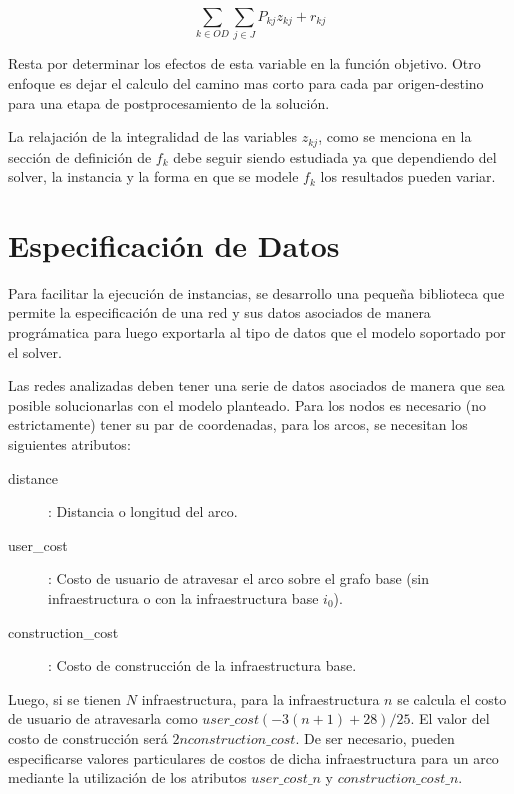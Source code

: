 \documentclass{article}
\begin{document}
  \begin{equation}
    \sum_{k \in OD} \sum_{j \in J} P_{kj}z_{kj} + r_{kj}
  \end{equation}

  Resta por determinar los efectos de esta variable en la función objetivo. Otro enfoque es dejar el calculo del camino mas corto para cada par origen-destino para una etapa de postprocesamiento de la solución.

  La relajación de la integralidad de las variables $z_{kj}$, como se menciona en la sección de definición de $f_k$ debe seguir siendo estudiada ya que dependiendo del solver, la instancia y la forma en que se modele $f_k$ los resultados pueden variar.

  \section*{Especificación de Datos}

  Para facilitar la ejecución de instancias, se desarrollo una pequeña biblioteca que permite la especificación de una red y sus datos asociados de manera prográmatica para luego exportarla al tipo de datos que el modelo soportado por el solver.

  Las redes analizadas deben tener una serie de datos asociados de manera que sea posible solucionarlas con el modelo planteado. Para los nodos es necesario (no estrictamente) tener su par de coordenadas, para los arcos, se necesitan los siguientes atributos:

  \begin{description}
    \item[distance]: Distancia o longitud del arco.
    \item[user\_cost]: Costo de usuario de atravesar el arco sobre el grafo base (sin infraestructura o con la infraestructura base $i_0$).
    \item[construction\_cost]: Costo de construcción de la infraestructura base.
  \end{description}

  Luego, si se tienen $N$ infraestructura, para la infraestructura $n$ se calcula el costo de usuario de atravesarla como $user\_cost (-3 (n + 1) + 28) / 25$. El valor del costo de construcción será $2 n construction\_cost$. De ser necesario, pueden especificarse valores particulares de costos de dicha infraestructura para un arco mediante la utilización de los atributos $user\_cost\_n$ y $construction\_cost\_n$.
\end{document}
